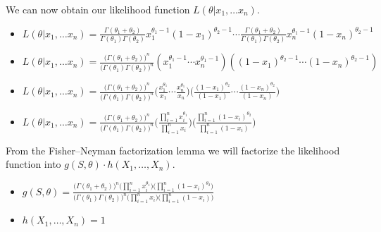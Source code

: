\documentclass[12pt]{article}
\begin{document}
We can now obtain our likelihood function $ L(\theta | x_{1}, \dots x_{n}) $. \\
\begin{itemize}
    \item $ \displaystyle L(\theta | x_{1}, \dots x_{n}) = \frac{\Gamma(\theta_{1} + \theta_{2})}{\Gamma(\theta_{1})\Gamma(\theta_{2})}x_{1}^{\theta_{1} - 1}(1 - x_{1})^{\theta_{2} - 1} \cdots \frac{\Gamma(\theta_{1} + \theta_{2})}{\Gamma(\theta_{1})\Gamma(\theta_{2})}x_{n}^{\theta_{1} - 1}(1 - x_{n})^{\theta_{2} - 1} $
    \item $ \displaystyle L(\theta | x_{1}, \dots x_{n}) = \frac{ \bigl( \Gamma(\theta_{1} + \theta_{2}) \bigr)^{n}}{ \bigl( \Gamma(\theta_{1})\Gamma(\theta_{2}) \bigr)^{n}} (x_{1}^{\theta_{1} - 1} \cdots x_{n}^{\theta_{1} - 1})((1 - x_{1})^{\theta_{2} - 1} \cdots (1 - x_{n})^{\theta_{2} - 1}) $
    \item $ \displaystyle L(\theta | x_{1}, \dots x_{n}) = \frac{ \bigl( \Gamma(\theta_{1} + \theta_{2}) \bigr)^{n}}{ \bigl( \Gamma(\theta_{1})\Gamma(\theta_{2}) \bigr)^{n}} \Biggl( \frac{x_{1}^{\theta_{1}}}{x_{1}} \cdots \frac{x_{n}^{\theta_{1}}}{x_{n}} \Biggr) \Biggl( \frac{(1 - x_{1})^{\theta_{2}}}{(1 - x_{1})} \cdots \frac{(1 - x_{n})^{\theta_{2}}}{(1 - x_{n})} \Biggr) $
    \item $ \displaystyle L(\theta | x_{1}, \dots x_{n}) = \frac{ \bigl( \Gamma(\theta_{1} + \theta_{2}) \bigr)^{n}}{ \bigl( \Gamma(\theta_{1})\Gamma(\theta_{2}) \bigr)^{n}} \Biggl( \frac{ \prod_{i=1}^{n} x_{i}^{\theta_{1}}}{ \prod_{i=1}^{n} x_{i}} \Biggr) \Biggl( \frac{ \prod_{i=1}^{n} (1 - x_{i})^{\theta_{2}}}{ \prod_{i=1}^{n} (1 - x_{i})} \Biggr) $
\end{itemize}

\noindent
From the Fisher–Neyman factorization lemma we will factorize the likelihood function into $ g(S, \theta) \cdot h(X_{1}, \dots , X_{n}) $. \\

\begin{itemize}
    \item $ \displaystyle g(S, \theta) = \frac{ \bigl( \Gamma(\theta_{1} + \theta_{2}) \bigr)^{n} \bigl( \prod_{i=1}^{n} x_{i}^{\theta_{1}} \bigr) \bigl( \prod_{i=1}^{n} (1 - x_{i})^{\theta_{2}} \bigr) }{ \bigl( \Gamma(\theta_{1})\Gamma(\theta_{2}) \bigr)^{n} \bigl( \prod_{i=1}^{n} x_{i} \bigr) \bigl( \prod_{i=1}^{n} (1 - x_{i}) \bigr) } $
    \item $ \displaystyle h(X_{1}, \dots , X_{n}) = 1 $
\end{itemize}
\end{document}
